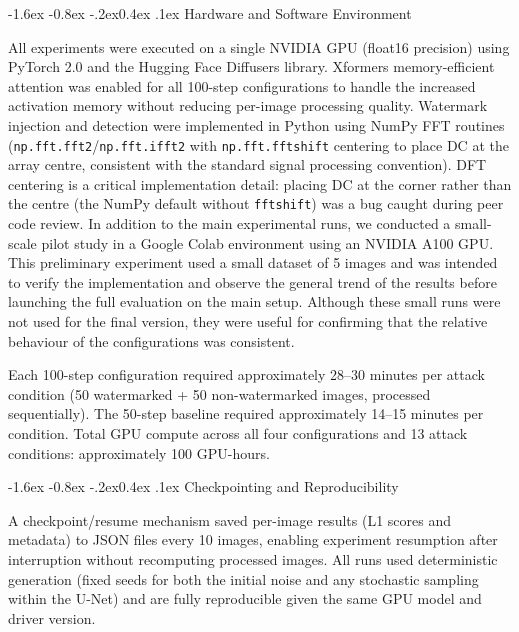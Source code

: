 \documentclass[10pt,twocolumn]{article}
\makeatletter
\renewcommand\subsection{\@startsection{subsection}{2}{\z@}%
  {-1.6ex \@plus -0.8ex \@minus -.2ex}{0.4ex \@plus .1ex}%
  {\normalfont\normalsize\itshape}}
\makeatother
\begin{document}
\subsection{Hardware and Software Environment}

All experiments were executed on a single NVIDIA GPU (float16 precision)
using PyTorch 2.0 and the Hugging Face Diffusers library.
Xformers memory-efficient attention was enabled for all 100-step
configurations to handle the increased activation memory without
reducing per-image processing quality.
Watermark injection and detection were implemented in Python using NumPy
FFT routines (\texttt{np.fft.fft2}/\texttt{np.fft.ifft2} with
\texttt{np.fft.fftshift} centering to place DC at the array centre,
consistent with the standard signal processing convention).
DFT centering is a critical implementation detail: placing DC at the
corner rather than the centre (the NumPy default without \texttt{fftshift})
was a bug caught during peer code review.
In addition to the main experimental runs, we conducted a small-scale
pilot study in a Google Colab environment using an NVIDIA A100 GPU.
This preliminary experiment used a small dataset of 5 images and was
intended to verify the implementation and observe the general trend of
the results before launching the full evaluation on the main setup.
Although these small runs were not used for the final version, 
they were useful for confirming that the relative behaviour of
the configurations was consistent.

Each 100-step configuration required approximately 28--30 minutes per
attack condition (50 watermarked + 50 non-watermarked images, processed
sequentially).
The 50-step baseline required approximately 14--15 minutes per condition.
Total GPU compute across all four configurations and 13 attack conditions:
approximately 100 GPU-hours.

\subsection{Checkpointing and Reproducibility}

A checkpoint/resume mechanism saved per-image results (L1 scores and
metadata) to JSON files every 10 images, enabling experiment resumption
after interruption without recomputing processed images.
All runs used deterministic generation (fixed seeds for both the initial
noise and any stochastic sampling within the U-Net) and are fully
reproducible given the same GPU model and driver version.
\end{document}
